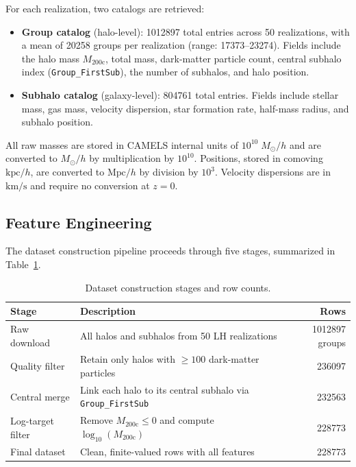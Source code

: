 \documentclass[12pt, a4paper]{article}
\newcommand{\logMhalo}{\log_{10}(M_{200\mathrm{c}})}
\newcommand{\Msun}{M_\odot}
\begin{document}
For each realization, two catalogs are retrieved:

\begin{itemize}[nosep]
  \item \textbf{Group catalog} (halo-level): \num{1012897} total entries across 50 realizations, with a mean of \num{20258} groups per realization (range: \num{17373}--\num{23274}).  Fields include the halo mass $M_{200\mathrm{c}}$, total mass, dark-matter particle count, central subhalo index (\texttt{Group\_FirstSub}), the number of subhalos, and halo position.
  \item \textbf{Subhalo catalog} (galaxy-level): \num{804761} total entries.  Fields include stellar mass, gas mass, velocity dispersion, star formation rate, half-mass radius, and subhalo position.
\end{itemize}

All raw masses are stored in CAMELS internal units of $10^{10}\;\Msun/h$ and are converted to $\Msun/h$ by multiplication by $10^{10}$.  Positions, stored in comoving $\mathrm{kpc}/h$, are converted to $\mathrm{Mpc}/h$ by division by $10^3$.  Velocity dispersions are in $\mathrm{km/s}$ and require no conversion at $z = 0$.

\subsection{Feature Engineering}
\label{sec:features}

The dataset construction pipeline proceeds through five stages, summarized in Table~\ref{tab:pipeline_stages}.

\begin{table}[H]
  \centering
  \caption{Dataset construction stages and row counts.}
  \label{tab:pipeline_stages}
  \begin{tabular}{@{}llr@{}}
    \toprule
    Stage & Description & Rows \\
    \midrule
    Raw download        & All halos and subhalos from 50 LH realizations        & \num{1012897} groups \\
    Quality filter      & Retain only halos with $\geq 100$ dark-matter particles & \num{236097} \\
    Central merge       & Link each halo to its central subhalo via \texttt{Group\_FirstSub} & \num{232563} \\
    Log-target filter   & Remove $M_{200\mathrm{c}} \leq 0$ and compute $\logMhalo$  & \num{228773} \\
    Final dataset       & Clean, finite-valued rows with all features             & \num{228773} \\
    \bottomrule
  \end{tabular}
\end{table}
\end{document}
